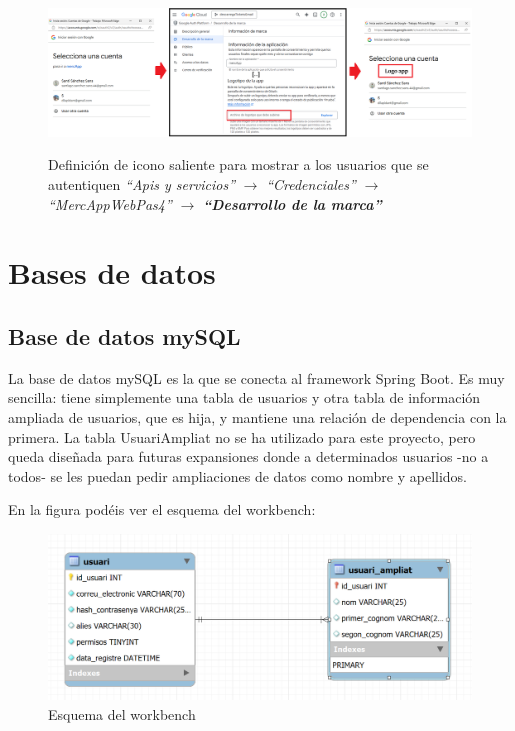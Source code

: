 \documentclass[a4paper,12pt]{report}
\begin{document}
	\FloatBarrier
	\setlength{\belowcaptionskip}{3pt}
	\begin{figure}[H]
		\centering
		\caption{Definición de icono saliente para mostrar a los usuarios que se autentiquen \textit{``Apis y servicios''} $\rightarrow$ \textit{``Credenciales''} $\rightarrow$ \textit{``MercAppWebPas4''} $\rightarrow$ \textbf{\textit{``Desarrollo de la marca''}}}
		\includegraphics[width=1\linewidth]{img/mercAppLogo}
		\label{fig:mercAppLogo}
	\end{figure}
	\FloatBarrier
	
	
	
	\section{Bases de datos}
	
	\subsection{Base de datos mySQL}
	
	La base de datos mySQL es la que se conecta al framework Spring Boot. Es muy sencilla: tiene simplemente una tabla de usuarios y otra tabla de información ampliada de usuarios, que es hija, y mantiene una relación de dependencia con la primera. La tabla UsuariAmpliat no se ha utilizado para este proyecto, pero queda diseñada para futuras expansiones donde a determinados usuarios -no a todos- se les puedan pedir ampliaciones de datos como nombre y apellidos.
	
	En la figura podéis ver el esquema del workbench:
	\FloatBarrier
	\begin{figure}[H]
		\centering
		\includegraphics[width=1\linewidth]{img/esquemaWorkbench}
		\caption{Esquema del workbench}
		\label{fig:esquemaworkbench}
	\end{figure}
	\FloatBarrier
	
\end{document}

